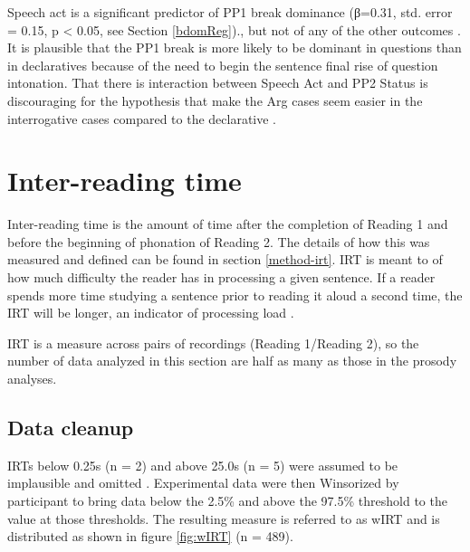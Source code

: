 \documentclass[12pt,oneside]{book}
\begin{document}
Speech act is a significant predictor of PP1 break dominance (β=0.31, std. error = 0.15, p \textless{} 0.05, see Section \ref{bdomReg})., but not of any of the other  outcomes . It is plausible that the PP1 break is more likely to be dominant in questions than in declaratives because of the need to begin the sentence final rise of question intonation. That there is  interaction between Speech Act and PP2 Status is discouraging for the hypothesis that  make the Arg cases seem easier in the interrogative cases compared to the declarative .

\hypertarget{irt}{%
\section{Inter-reading time}\label{irt}}

Inter-reading time is the amount of time after the completion of Reading 1 and before the beginning of phonation of Reading 2. The details of how this was measured and defined can be found in section \ref{method-irt}. IRT is meant to  of how much difficulty the reader has in processing a given sentence. If a reader spends more time studying a sentence prior to reading it aloud a second time, the IRT will be longer,  an indicator of processing load .

 IRT is a measure across pairs of recordings (Reading 1/Reading 2), so the number of data analyzed in this section are half as many as those in the prosody analyses.

\hypertarget{irtDis}{%
\subsection{Data cleanup}\label{irtDis}}

IRTs below 0.25s (n = 2) and above 25.0s (n = 5) were assumed to be implausible and omitted . Experimental data were then Winsorized by participant to bring data below the 2.5\% and above the 97.5\% threshold to the value at those thresholds. The resulting measure is referred to as wIRT and is distributed as shown in figure \ref{fig:wIRT} (n = 489).
\end{document}
